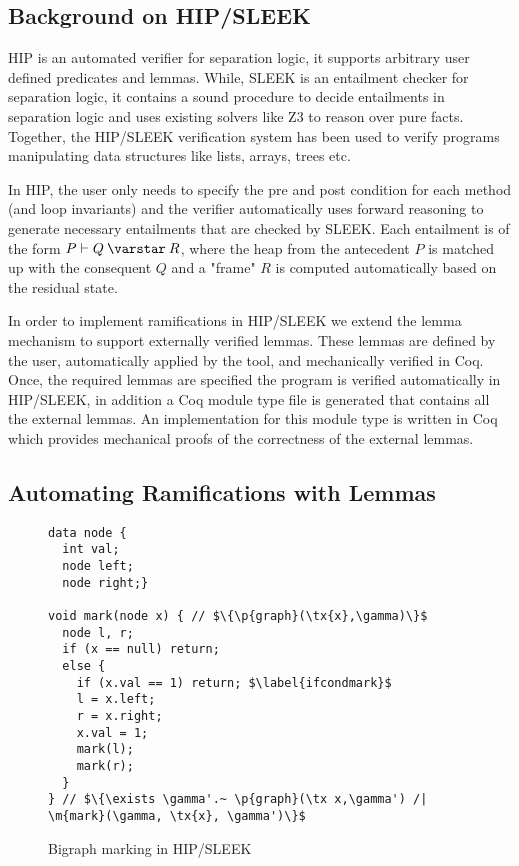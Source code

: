 \subsection{Background on HIP/SLEEK}
HIP is an automated verifier for separation logic, it supports arbitrary user defined predicates and lemmas. While, SLEEK
is an entailment checker for separation logic, it contains a sound  procedure to decide entailments in separation logic and uses existing solvers like Z3 to reason over pure facts. Together, the HIP/SLEEK verification system \cite{chin:hipsleek} has been used to verify programs manipulating data structures like lists, arrays, trees etc.

In HIP, the user only needs to specify the pre and post condition for each method (and loop invariants) and the verifier automatically uses forward reasoning to generate necessary entailments that are checked by SLEEK. Each entailment is of the form $P \vdash Q \scon R$, where the heap from the antecedent $P$ is matched up with the consequent $Q$ and a "frame" $R$ is computed automatically based on the residual state.

In order to implement ramifications in HIP/SLEEK we extend the lemma mechanism \cite{NguyenC08} to support externally verified lemmas. These lemmas are defined by the user, automatically applied by the tool, and mechanically verified in Coq. Once, the required lemmas are specified the program is verified automatically in HIP/SLEEK, in addition a Coq module type file is generated that contains all the external lemmas. An implementation for this module type is written in Coq which provides mechanical proofs of the correctness of the external lemmas.

\subsection{Automating Ramifications with Lemmas}

\begin{figure}[t]
  \begin{lstlisting}
data node {
  int val;
  node left;
  node right;}

void mark(node x) { // $\{\p{graph}(\tx{x},\gamma)\}$
  node l, r;
  if (x == null) return;
  else {
    if (x.val == 1) return; $\label{ifcondmark}$
    l = x.left;
    r = x.right;
    x.val = 1;
    mark(l);
    mark(r);
  }
} // $\{\exists \gamma'.~ \p{graph}(\tx x,\gamma') /| \m{mark}(\gamma, \tx{x}, \gamma')\}$
\end{lstlisting}
\caption{Bigraph marking in HIP/SLEEK}
\label{fig:hipmarkgraph}
\end{figure}

